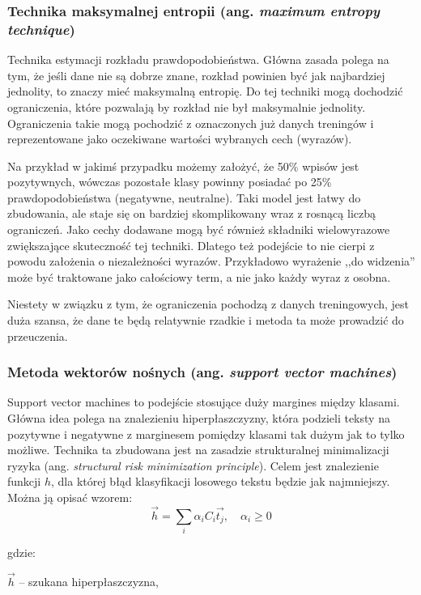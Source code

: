 \subsubsection{Technika maksymalnej entropii (ang. \textit{maximum entropy technique})}
Technika estymacji rozkładu prawdopodobieństwa. Główna zasada polega na tym,
że jeśli dane nie są dobrze znane, rozkład powinien być jak najbardziej jednolity,
to znaczy mieć maksymalną entropię. Do tej techniki mogą dochodzić ograniczenia,
które pozwalają by rozkład nie był maksymalnie jednolity. Ograniczenia
takie mogą pochodzić z oznaczonych już danych treningów i reprezentowane jako
oczekiwane wartości wybranych cech (wyrazów). 

Na przykład w jakimś przypadku
możemy założyć, że 50\% wpisów jest pozytywnych, wówczas pozostałe klasy
powinny posiadać po 25\% prawdopodobieństwa (negatywne, neutralne).
Taki model jest łatwy do zbudowania, ale staje się on bardziej skomplikowany
wraz z rosnącą liczbą ograniczeń. Jako cechy dodawane mogą być również
składniki wielowyrazowe zwiększające skuteczność tej techniki. Dlatego też
podejście to nie cierpi z powodu założenia o niezależności wyrazów.
Przykładowo wyrażenie ,,do widzenia'' może być traktowane jako całościowy term,
a nie jako każdy wyraz z osobna.

Niestety w związku z tym, że ograniczenia pochodzą z danych treningowych,
jest duża szansa, że dane te będą relatywnie rzadkie i metoda ta może prowadzić
do przeuczenia.


\subsubsection{Metoda wektorów nośnych (ang. \textit{support vector machines})}
Support vector machines to podejście stosujące duży margines między klasami.
Główna idea polega na znalezieniu hiperpłaszczyzny, która podzieli teksty na pozytywne
i negatywne z marginesem pomiędzy klasami tak dużym jak to tylko możliwe.
Technika ta zbudowana jest na zasadzie strukturalnej minimalizacji ryzyka 
(ang. \textit{structural risk minimization principle}). Celem jest znalezienie
funkcji $h$, dla której błąd klasyfikacji losowego tekstu będzie jak najmniejszy.
Można ją opisać wzorem:
\begin{equation}
\vec{h} = \sum\limits_{i}\alpha_iC_i\vec{t_j}, \quad \alpha_i \geq 0
\end{equation}

gdzie:

$\vec{h}$ -- szukana hiperpłaszczyzna,


